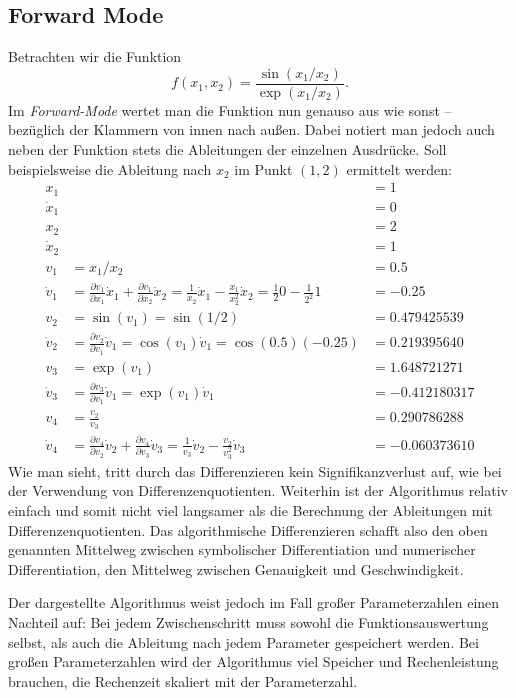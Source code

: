 \documentclass{scrartcl}
\begin{document}
\subsection{Forward Mode}
Betrachten wir die Funktion 
\begin{equation}
f(x_1, x_2) = \frac{\sin(x_1/x_2)}{\exp(x_1/x_2)}. \label{eq:example_func}
\end{equation}
Im \emph{Forward-Mode} wertet man die Funktion nun genauso aus wie sonst -- bezüglich der Klammern von innen nach außen. Dabei notiert man jedoch auch neben der Funktion stets die Ableitungen der einzelnen Ausdrücke. Soll beispielsweise die Ableitung nach $x_2$ im Punkt $(1,2)$ ermittelt werden:
\begin{equation*}
\begin{aligned}
	x_1 &&= 1\\
	\dot{x}_1 &&= 0\\[0.3cm]
	x_2 &&= 2\\
	\dot{x}_2 &&= 1\\[0.3cm]
	v_1 &= x_1/x_2 &= \num{0,5} \\
	\dot{v}_1 &= \tfrac{\partial v_1}{\partial x_1}\dot{x}_1 + \tfrac{\partial v_1}{\partial x_2}\dot{x}_2 = \tfrac{1}{x_2}\dot{x}_1 - \tfrac{x_1}{x_2^2}\dot{x}_2 = \tfrac{1}{2}0 - \tfrac{1}{2^2}1 &= \num{-0,25}\\[0.3cm]
	v_2 &= \sin(v_1) = \sin(1/2) &= \num{0.479425539}\\
	\dot{v}_2 &= \tfrac{\partial v_2}{\partial v_1}\dot{v}_1 = \cos(v_1)\dot v_1 = \cos(\num{0,5})(-\num{0,25}) &= \num{0.219395640}\\[0.3cm]
	v_3 &= \exp(v_1) &= \num{1.648721271}\\
	\dot v_3 &= \tfrac{\partial v_3}{\partial v_1}\dot v_1 = \exp(v_1)\dot v_1 &= \num{-0.412180317} \\[0.3cm]
	v_4 &= \tfrac{v_2}{v_3} &= \num{0.290786288} \\
	\dot v_4 &= \tfrac{\partial v_4}{\partial v_2} \dot v_2 + \tfrac{\partial v_4}{\partial v_3}\dot v_3 = \tfrac{1}{v_3}\dot v_2 - \tfrac{v_2}{v_3^2}\dot v_3 &= \num{-0.060373610}
\end{aligned}
\end{equation*}
Wie man sieht, tritt durch das Differenzieren kein Signifikanzverlust auf, wie bei der Verwendung von Differenzenquotienten. Weiterhin ist der Algorithmus relativ einfach und somit nicht viel langsamer als die Berechnung der Ableitungen mit Differenzenquotienten. Das algorithmische Differenzieren schafft also den oben genannten Mittelweg zwischen symbolischer Differentiation und numerischer Differentiation, den Mittelweg zwischen Genauigkeit und Geschwindigkeit.\par
Der dargestellte Algorithmus weist jedoch im Fall großer Parameterzahlen einen Nachteil auf: Bei jedem Zwischenschritt muss sowohl die Funktionsauswertung selbst, als auch die Ableitung nach jedem Parameter gespeichert werden. Bei großen Parameterzahlen wird der Algorithmus viel Speicher und Rechenleistung brauchen, die Rechenzeit skaliert mit der Parameterzahl.
\end{document}
